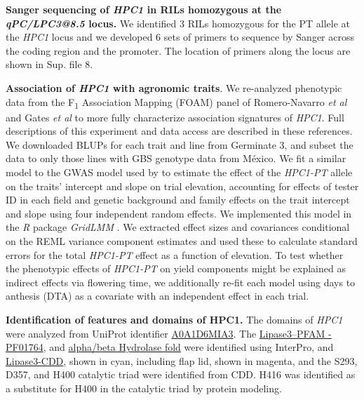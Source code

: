 \documentclass[9pt,twocolumn,twoside,lineno]{biorxiv}
\begin{document}
\textbf{Sanger sequencing of \textit{HPC1} in RILs homozygous at the \textit{qPC/LPC3@8.5} locus.}
We identified 3 RILs homozygous for the PT allele at the \textit{HPC1} locus and we developed 6 sets of primers to sequence by Sanger across the coding region and the promoter. 
The location of primers along the locus are shown in Sup. file 8. 

\textbf{Association of \textit{HPC1} with agronomic traits}.
We re-analyzed phenotypic data from the F\textsubscript{1} Association Mapping (FOAM) panel of Romero-Navarro \textit{et al} \cite{Romero_Navarro2017-cn} and Gates \textit{et al} \cite{Gates2019-xu} to more fully characterize association signatures of \textit{HPC1}. 
Full descriptions of this experiment and data access are described in these references. 
We downloaded BLUPs for each trait and line from Germinate 3, and subset the data to only those lines with GBS genotype data from México. 
We fit a similar model to the GWAS model used by \cite{Gates2019-xu} to estimate the effect of the \textit{HPC1-PT} allele on the traits' intercept and slope on trial elevation, accounting for effects of tester ID in each field and genetic background and family effects on the trait intercept and slope using four independent random effects. 
We implemented this model in the \textit{R} package \textit{GridLMM} \cite{Runcie2019-Gr}. 
We extracted effect sizes and covariances conditional on the REML variance component estimates and used these to calculate standard errors for the total \textit{HPC1-PT} effect as a function of elevation. 
To test whether the phenotypic effects of \textit{HPC1-PT} on yield components might be explained as indirect effects via flowering time, we additionally re-fit each model using days to anthesis (DTA) as a covariate with an independent effect in each trial.

\textbf{Identification of features and domains of HPC1.}
The domains of \textit{HPC1} were analyzed from UniProt identifier \hyperlink{https://www.uniprot.org/uniprot/A0A1D6MIA3}{A0A1D6MIA3}. 
The \hyperlink{https://www.ebi.ac.uk/interpro/entry/pfam/PF01764/}{Lipase3--PFAM - PF01764}, and \hyperlink{https://www.ebi.ac.uk/interpro/entry/InterPro/IPR029058/}{alpha/beta Hydrolase fold} were identified using InterPro, and \hyperlink{https://www.ncbi.nlm.nih.gov/Structure/cdd/cddsrv.cgi?uid=cd00519}{Lipase3-CDD}, shown in cyan, including flap lid, shown in magenta, and the S293, D357, and H400 catalytic triad were identified from CDD. 
H416 was identified as a substitute for H400 in the catalytic triad by protein modeling.
\end{document}
